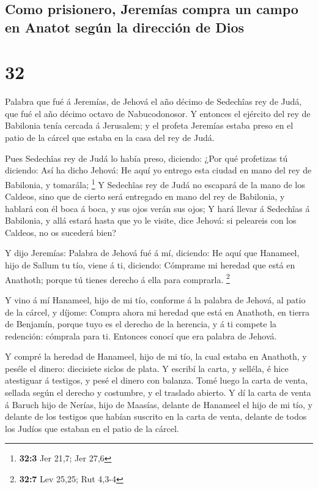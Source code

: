 \hypertarget{como-prisionero-jeremuxedas-compra-un-campo-en-anatot-seguxfan-la-direcciuxf3n-de-dios}{%
\subsection{Como prisionero, Jeremías compra un campo en Anatot según la
dirección de
Dios}\label{como-prisionero-jeremuxedas-compra-un-campo-en-anatot-seguxfan-la-direcciuxf3n-de-dios}}

\hypertarget{section-31}{%
\section{32}\label{section-31}}

 Palabra que fué á Jeremías, de Jehová el año décimo de
Sedechîas rey de Judá, que fué el año décimo octavo de Nabucodonosor.
 Y entonces el ejército del rey de Babilonia tenía cercada
á Jerusalem; y el profeta Jeremías estaba preso en el patio de la cárcel
que estaba en la casa del rey de Judá.

 Pues Sedechîas rey de Judá lo había preso, diciendo: ¿Por
qué profetizas tú diciendo: Así ha dicho Jehová: He aquí yo entrego esta
ciudad en mano del rey de Babilonia, y tomarála; \footnote{\textbf{32:3}
  Jer 21,7; Jer 27,6}  Y Sedechîas rey de Judá no escapará
de la mano de los Caldeos, sino que de cierto será entregado en mano del
rey de Babilonia, y hablará con él boca á boca, y sus ojos verán sus
ojos;  Y hará llevar á Sedechîas á Babilonia, y allá
estará hasta que yo le visite, dice Jehová: si peleareis con los
Caldeos, no os sucederá bien?

 Y dijo Jeremías: Palabra de Jehová fué á mí, diciendo:
 He aquí que Hanameel, hijo de Sallum tu tío, viene á ti,
diciendo: Cómprame mi heredad que está en Anathoth; porque tú tienes
derecho á ella para comprarla. \footnote{\textbf{32:7} Lev 25,25; Rut
  4,3-4}

 Y vino á mí Hanameel, hijo de mi tío, conforme á la
palabra de Jehová, al patio de la cárcel, y díjome: Compra ahora mi
heredad que está en Anathoth, en tierra de Benjamín, porque tuyo es el
derecho de la herencia, y á ti compete la redención: cómprala para ti.
Entonces conocí que era palabra de Jehová.

 Y compré la heredad de Hanameel, hijo de mi tío, la cual
estaba en Anathoth, y peséle el dinero: diecisiete siclos de plata.
 Y escribí la carta, y selléla, é hice atestiguar á
testigos, y pesé el dinero con balanza.  Tomé luego la
carta de venta, sellada según el derecho y costumbre, y el traslado
abierto.  Y dí la carta de venta á Baruch hijo de Nerías,
hijo de Maasías, delante de Hanameel el hijo de mi tío, y delante de los
testigos que habían suscrito en la carta de venta, delante de todos los
Judíos que estaban en el patio de la cárcel.

